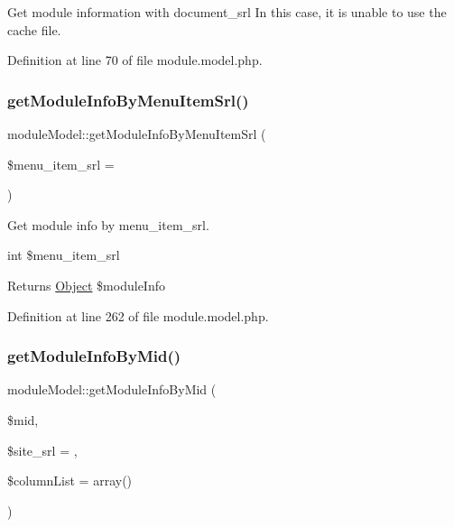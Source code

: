 Get module information with document\+\_\+srl In this case, it is unable to use the cache file. 



Definition at line 70 of file module.\+model.\+php.

\hypertarget{classmoduleModel_a48fc8aa25e189a13e7416d4c92e3aa04}{}\label{classmoduleModel_a48fc8aa25e189a13e7416d4c92e3aa04} 
\subsubsection{\texorpdfstring{get\+Module\+Info\+By\+Menu\+Item\+Srl()}{getModuleInfoByMenuItemSrl()}}
{\footnotesize\ttfamily module\+Model\+::get\+Module\+Info\+By\+Menu\+Item\+Srl (\begin{DoxyParamCaption}\item[{}]{\$menu\+\_\+item\+\_\+srl = {} }\end{DoxyParamCaption})}

Get module info by menu\+\_\+item\+\_\+srl.

int \$menu\+\_\+item\+\_\+srl

\begin{DoxyReturn}{Returns}
\hyperlink{classObject}{Object} \$module\+Info 
\end{DoxyReturn}


Definition at line 262 of file module.\+model.\+php.

\hypertarget{classmoduleModel_a543ca661568188ef493ff138246de29c}{}\label{classmoduleModel_a543ca661568188ef493ff138246de29c} 
\subsubsection{\texorpdfstring{get\+Module\+Info\+By\+Mid()}{getModuleInfoByMid()}}
{\footnotesize\ttfamily module\+Model\+::get\+Module\+Info\+By\+Mid (\begin{DoxyParamCaption}\item[{}]{\$mid,  }\item[{}]{\$site\+\_\+srl = {},  }\item[{}]{\$column\+List = {\ttfamily array()} }\end{DoxyParamCaption})}



